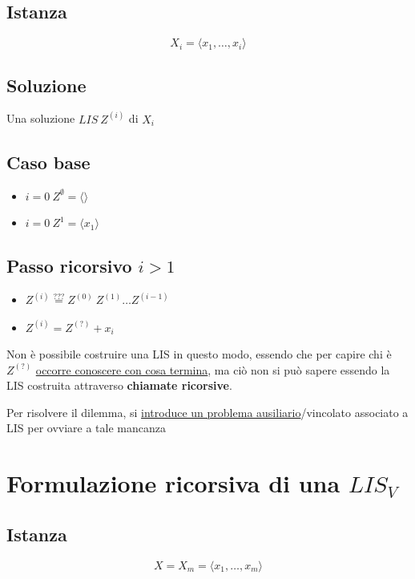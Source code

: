 \subsection{Istanza}
{
    \large
    $$
        X_i = \langle x_1, \dots, x_i \rangle
    $$
}

\subsection{Soluzione}
Una soluzione $LIS\ Z^{(i)}$ di $X_i$

\subsection{Caso base}
{
    \large

    \begin{itemize}
        \item $i=0\ Z^{\emptyset} = \langle \rangle$
        \item $i=0\ Z^{1} = \langle x_1 \rangle$
    \end{itemize}
}

\subsection{Passo ricorsivo $i > 1$}
{
    \large

    \begin{itemize}
        \item $Z^{(i)} \stackrel{???}{=} Z^{(0)}\ Z^{(1)} \dots Z^{(i-1)}$
        \item $Z^{(i)} = Z^{(?)} + x_i$
    \end{itemize}
}

Non è possibile costruire una LIS in questo modo, essendo che per capire chi è $Z^{(?)}$ \uline{occorre conoscere con cosa termina}, ma ciò non si può sapere essendo la LIS costruita attraverso \textbf{chiamate ricorsive}.

Per risolvere il dilemma, si \uline{introduce un problema ausiliario}/vincolato associato a LIS per ovviare a tale mancanza

\newpage
\section{Formulazione ricorsiva di una $LIS_V$}
\subsection{Istanza}
{
    \large
    $$
        X=X_m=\langle x_1, \dots, x_m \rangle
    $$
}
